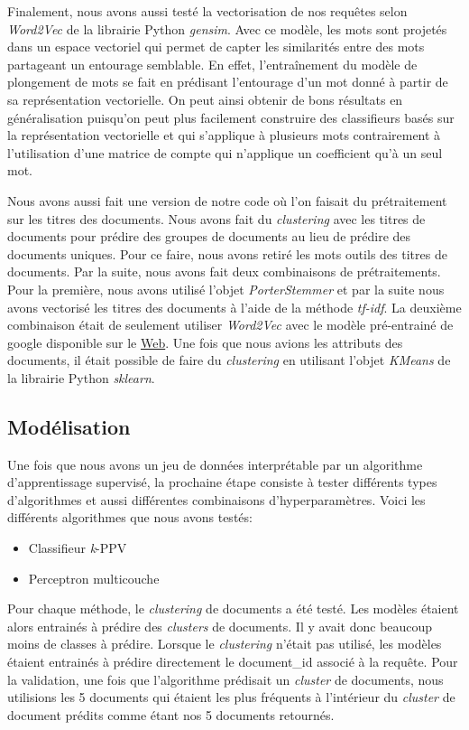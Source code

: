 Finalement, nous avons aussi testé la vectorisation de nos requêtes selon \textit{Word2Vec} de la librairie Python \textit{gensim}.
Avec ce modèle, les mots sont projetés dans un espace vectoriel qui permet de capter les similarités entre des mots partageant un entourage semblable. En effet, l'entraînement du modèle de plongement de mots se fait en prédisant l'entourage d'un mot donné à partir de sa représentation vectorielle. On peut ainsi obtenir de bons résultats en généralisation puisqu'on peut plus facilement construire des classifieurs basés sur la représentation vectorielle et qui s'applique à plusieurs mots contrairement à l'utilisation d'une matrice de compte qui n'applique un coefficient qu'à un seul mot.

Nous avons aussi fait une version de notre code où l'on faisait du prétraitement sur les titres des documents. Nous avons fait du \textit{clustering} avec les titres de documents pour prédire des groupes de documents au lieu de prédire des documents uniques. Pour ce faire, nous avons retiré les mots outils des titres de documents. Par la suite, nous avons fait deux combinaisons de prétraitements. Pour la première, nous avons utilisé l'objet \textit{PorterStemmer} et par la suite nous avons vectorisé les titres des documents à l'aide de la méthode \textit{tf-idf}. La deuxième combinaison était de seulement utiliser \textit{Word2Vec} avec le modèle pré-entrainé de google disponible sur le \href{https://code.google.com/archive/p/word2vec/}{Web}. Une fois que nous avions les attributs des documents, il était possible de faire du \textit{clustering} en utilisant l'objet \textit{KMeans} de la librairie Python \textit{sklearn}. 

\subsection{Modélisation}

Une fois que nous avons un jeu de données interprétable par un algorithme d'apprentissage supervisé, la prochaine étape consiste à tester différents types d'algorithmes et aussi différentes combinaisons d'hyperparamètres. Voici les différents algorithmes que nous avons testés:

\begin{itemize}
  \item Classifieur \textit{k}-PPV
  \item Perceptron multicouche
\end{itemize}

Pour chaque méthode, le \textit{clustering} de documents a été testé. Les modèles étaient alors entrainés à prédire des \textit{clusters} de documents. Il y avait donc beaucoup moins de classes à prédire. Lorsque le \textit{clustering} n'était pas utilisé, les modèles étaient entrainés à prédire directement le document\_id associé à la requête. Pour la validation, une fois que l'algorithme prédisait un \textit{cluster} de documents, nous utilisions les 5 documents qui étaient les plus fréquents à l'intérieur du \textit{cluster} de document prédits comme étant nos 5 documents retournés.

